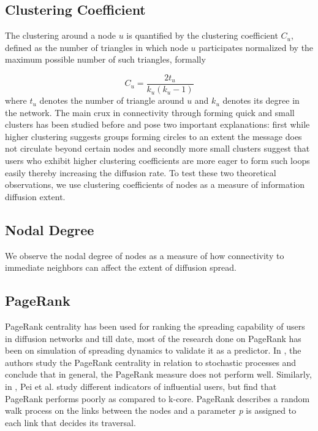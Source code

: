 \documentclass[smallextended]{svjour3}       %
\theoremstyle{definition}
\begin{document}
\subsection{Clustering Coefficient}
The clustering around a node $u$ is quantified by the clustering coefficient $C_u$, defined as the number of triangles in which node $u$ participates
normalized by the maximum possible number of such triangles, formally

\begin{equation*}
C_u = \frac{2t_u}{k_u(k_u-1)}
\end{equation*}
where $t_u$ denotes the number of triangle around $u$ and $k_u$ denotes its degree in the network. The main crux in connectivity through forming quick and small clusters has been studied before and pose two important explanations: first while higher clustering suggests groups forming circles to an extent the message does not circulate beyond certain nodes and secondly more small clusters suggest that users who exhibit higher clustering coefficients are more eager to form such loops easily thereby increasing the diffusion rate. To test these two theoretical observations, we use clustering coefficients of nodes as a measure of information diffusion extent.

\subsection{Nodal Degree}
We observe the nodal degree of nodes as a measure of how connectivity to immediate neighbors can affect the extent of diffusion spread.

\subsection{PageRank}
PageRank centrality \cite{PageRank} has been used for ranking the spreading capability of users in diffusion networks and till date, most of the research done on PageRank has been on simulation of spreading dynamics to validate it as a predictor.  In \cite{Ghosh_pr}, the authors study the PageRank centrality in relation to stochastic processes and conclude that in general, the PageRank measure does not perform well. Similarly, in \cite{sei_spreaders}, Pei et al. study different indicators of influential users, but find that PageRank performs poorly as compared to k-core. PageRank describes a random walk process on the links between the nodes and a parameter \textit{p} is assigned to each link that decides its traversal. 
\end{document}
